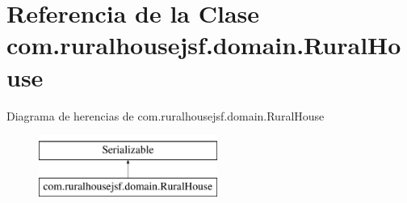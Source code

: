 \hypertarget{classcom_1_1ruralhousejsf_1_1domain_1_1_rural_house}{}\section{Referencia de la Clase com.\+ruralhousejsf.\+domain.\+Rural\+House}
\label{classcom_1_1ruralhousejsf_1_1domain_1_1_rural_house}
Diagrama de herencias de com.\+ruralhousejsf.\+domain.\+Rural\+House\begin{figure}[H]
\begin{center}
\leavevmode
\includegraphics[height=2.000000cm]{dd/d77/classcom_1_1ruralhousejsf_1_1domain_1_1_rural_house}
\end{center}
\end{figure}
